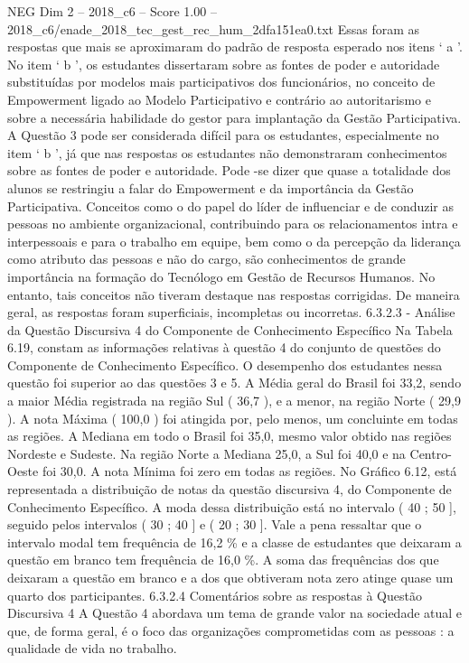 \begin{textsample}{NEG Dim 2 – 2018\_c6 – Score 1.00 – 2018\_c6/enade\_2018\_tec\_gest\_rec\_hum\_2dfa151ea0.txt}
Essas foram as respostas que mais se aproximaram do padrão de resposta esperado nos itens ‘ a ’.
No item ‘ b ’, os estudantes dissertaram sobre as fontes de poder e autoridade substituídas por modelos mais participativos dos funcionários, no conceito de Empowerment ligado ao Modelo Participativo e contrário ao autoritarismo e sobre a necessária habilidade do gestor para implantação da Gestão Participativa.
A Questão 3 pode ser considerada difícil para os estudantes, especialmente no item ‘ b ’, já que nas respostas os estudantes não demonstraram conhecimentos sobre as fontes de poder e autoridade.
Pode -se dizer que quase a totalidade dos alunos se restringiu a falar do Empowerment e da importância da Gestão Participativa.
Conceitos como o do papel do líder de influenciar e de conduzir as pessoas no ambiente organizacional, contribuindo para os relacionamentos intra e interpessoais e para o trabalho em equipe, bem como o da percepção da liderança como atributo das pessoas e não do cargo, são conhecimentos de grande importância na formação do Tecnólogo em Gestão de Recursos Humanos.
No entanto, tais conceitos não tiveram destaque nas respostas corrigidas.
De maneira geral, as respostas foram superficiais, incompletas ou incorretas. 6.3.2.3 - Análise da Questão Discursiva 4 do Componente de Conhecimento Específico Na Tabela 6.19, constam as informações relativas à questão 4 do conjunto de questões do Componente de Conhecimento Específico.
O desempenho dos estudantes nessa questão foi superior ao das questões 3 e 5.
A Média geral do Brasil foi 33,2, sendo a maior Média registrada na região Sul ( 36,7 ), e a menor, na região Norte ( 29,9 ).
A nota Máxima ( 100,0 ) foi atingida por, pelo menos, um concluinte em todas as regiões.
A Mediana em todo o Brasil foi 35,0, mesmo valor obtido nas regiões Nordeste e Sudeste.
Na região Norte a Mediana 25,0, a Sul foi 40,0 e na Centro-Oeste foi 30,0.
A nota Mínima foi zero em todas as regiões.
No Gráfico 6.12, está representada a distribuição de notas da questão discursiva 4, do Componente de Conhecimento Específico.
A moda dessa distribuição está no intervalo ( 40 ; 50 ], seguido pelos intervalos ( 30 ; 40 ] e ( 20 ; 30 ].
Vale a pena ressaltar que o intervalo modal tem frequência de 16,2 \% e a classe de estudantes que deixaram a questão em branco tem frequência de 16,0 \%.
A soma das frequências dos que deixaram a questão em branco e a dos que obtiveram nota zero atinge quase um quarto dos participantes. 6.3.2.4 Comentários sobre as respostas à Questão Discursiva 4 A Questão 4 abordava um tema de grande valor na sociedade atual e que, de forma geral, é o foco das organizações comprometidas com as pessoas : a qualidade de vida no trabalho.

\end{textsample}
